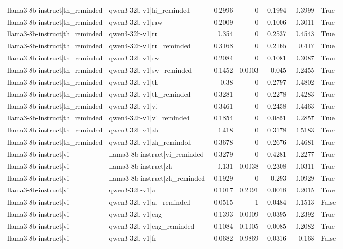 \begin{table}
\begin{tabular}{l l r r r r l}
llama3-8b-instruct|th_reminded & qwen3-32b-v1|hi_reminded & 0.2996 & 0 & 0.1994 & 0.3999 & True \\
llama3-8b-instruct|th_reminded & qwen3-32b-v1|raw & 0.2009 & 0 & 0.1006 & 0.3011 & True \\
llama3-8b-instruct|th_reminded & qwen3-32b-v1|ru & 0.354 & 0 & 0.2537 & 0.4543 & True \\
llama3-8b-instruct|th_reminded & qwen3-32b-v1|ru_reminded & 0.3168 & 0 & 0.2165 & 0.417 & True \\
llama3-8b-instruct|th_reminded & qwen3-32b-v1|sw & 0.2084 & 0 & 0.1081 & 0.3087 & True \\
llama3-8b-instruct|th_reminded & qwen3-32b-v1|sw_reminded & 0.1452 & 0.0003 & 0.045 & 0.2455 & True \\
llama3-8b-instruct|th_reminded & qwen3-32b-v1|th & 0.38 & 0 & 0.2797 & 0.4802 & True \\
llama3-8b-instruct|th_reminded & qwen3-32b-v1|th_reminded & 0.3281 & 0 & 0.2278 & 0.4283 & True \\
llama3-8b-instruct|th_reminded & qwen3-32b-v1|vi & 0.3461 & 0 & 0.2458 & 0.4463 & True \\
llama3-8b-instruct|th_reminded & qwen3-32b-v1|vi_reminded & 0.1854 & 0 & 0.0851 & 0.2857 & True \\
llama3-8b-instruct|th_reminded & qwen3-32b-v1|zh & 0.418 & 0 & 0.3178 & 0.5183 & True \\
llama3-8b-instruct|th_reminded & qwen3-32b-v1|zh_reminded & 0.3678 & 0 & 0.2676 & 0.4681 & True \\
llama3-8b-instruct|vi & llama3-8b-instruct|vi_reminded & -0.3279 & 0 & -0.4281 & -0.2277 & True \\
llama3-8b-instruct|vi & llama3-8b-instruct|zh & -0.131 & 0.0038 & -0.2308 & -0.0311 & True \\
llama3-8b-instruct|vi & llama3-8b-instruct|zh_reminded & -0.1929 & 0 & -0.293 & -0.0929 & True \\
llama3-8b-instruct|vi & qwen3-32b-v1|ar & 0.1017 & 0.2091 & 0.0018 & 0.2015 & True \\
llama3-8b-instruct|vi & qwen3-32b-v1|ar_reminded & 0.0515 & 1 & -0.0484 & 0.1513 & False \\
llama3-8b-instruct|vi & qwen3-32b-v1|eng & 0.1393 & 0.0009 & 0.0395 & 0.2392 & True \\
llama3-8b-instruct|vi & qwen3-32b-v1|eng_reminded & 0.1084 & 0.1005 & 0.0085 & 0.2082 & True \\
llama3-8b-instruct|vi & qwen3-32b-v1|fr & 0.0682 & 0.9869 & -0.0316 & 0.168 & False \\

\end{tabular}
\end{table}
